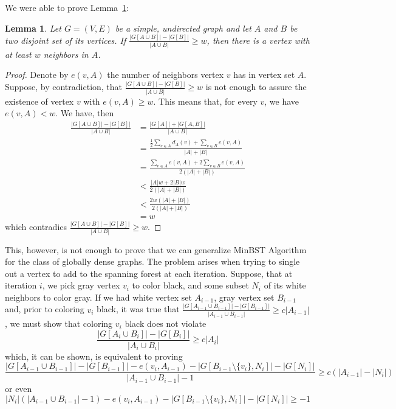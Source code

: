 \documentclass[12pt]{article}
\newtheorem{lemma}[theorem]{Lemma}
\begin{document}
We were able to prove Lemma~\ref{lemma1}:
\begin{lemma} \label{lemma1}
  Let $G = (V, E)$ be a simple, undirected graph and let $A$ and $B$ be two disjoint set of its vertices.
  If $\frac{|G[A \cup B]| - |G[B]|}{|A \cup B|} \ge w$, then there is a vertex with at least $w$ neighbors in $A$.
\end{lemma}
\begin{proof}
  Denote by $e(v, A)$ the number of neighbors vertex $v$ has in vertex set $A$.
  Suppose, by contradiction, that $\frac{|G[A \cup B]| - |G[B]|}{|A \cup B|} \ge w$ is not enough to assure the existence of vertex $v$ with $e(v, A) \ge w$.
  This means that, for every $v$, we have $e(v, A) < w$.
  We have, then
  \begin{align*}
    \frac{|G[A \cup B]| - |G[B]|}{|A \cup B|} &= \frac{|G[A]| + |G[A, B]|}{|A \cup B|} \\
                                              &= \frac{\frac{1}{2}\sum_{v \in A}d_A(v) + \sum_{v \in B}e(v, A)}{|A| + |B|} \\
                                              &= \frac{\sum_{v \in A}e(v, A) + 2\sum_{v \in B}e(v, A)}{2(|A| + |B|)} \\
                                              &< \frac{|A|w + 2|B|w}{2(|A| + |B|)} \\
                                              &< \frac{2w(|A| + |B|)}{2(|A| + |B|)} \\
                                              &= w
  \end{align*}
  which contradics $\frac{|G[A \cup B]| - |G[B]|}{|A \cup B|} \ge w$.
\end{proof}
This, however, is not enough to prove that we can generalize MinBST Algorithm for the class of globally dense graphs.
The problem arises when trying to single out a vertex to add to the spanning forest at each iteration.
Suppose, that at iteration $i$, we pick gray vertex $v_i$ to color black, and some subset $N_i$ of its white neighbors to color gray.
If we had white vertex set $A_{i - 1}$, gray vertex set $B_{i - 1}$ and, prior to coloring $v_i$ black, it was true that $\frac{|G[A_{i - 1} \cup B_{i - 1}]| - |G[B_{i - 1}]|}{|A_{i - 1} \cup B_{i - 1}|} \ge c|A_{i - 1}|$, we must show that coloring $v_i$ black does not violate
$$\frac{|G[A_i \cup B_i]| - |G[B_i]|}{|A_i \cup B_i|} \ge c|A_i|$$
which, it can be shown, is equivalent to proving
$$\frac{|G[A_{i - 1} \cup B_{i - 1}]| - |G[B_{i - 1}]| - e(v_i, A_{i - 1}) - |G[B_{i - 1} \setminus \{v_i\}, N_i]| - |G[N_i]|}{|A_{i - 1} \cup B_{i - 1}| - 1} \ge c(|A_{i - 1}| - |N_i|)$$
or even
$$|N_i|(|A_{i-1} \cup B_{i-1}| - 1) - e(v_i, A_{i - 1}) - |G[B_{i-1} \setminus \{v_i\}, N_i]| - |G[N_i]| \ge -1$$
\end{document}
